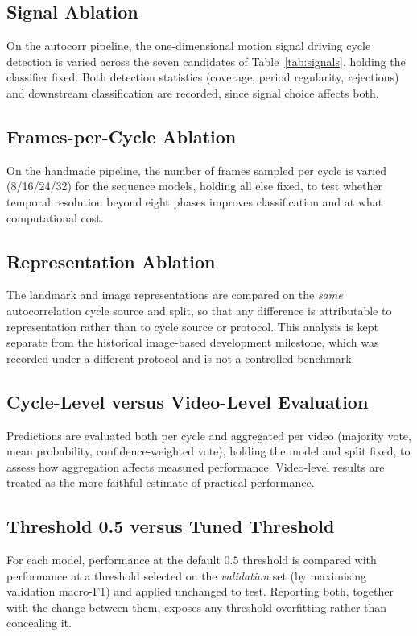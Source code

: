 \subsection{Signal Ablation}
\label{sec:abl-signal}
On the autocorr pipeline, the one-dimensional motion signal driving cycle
detection is varied across the seven candidates of
Table~\ref{tab:signals}, holding the classifier fixed. Both detection
statistics (coverage, period regularity, rejections) and downstream
classification are recorded, since signal choice affects both.

\subsection{Frames-per-Cycle Ablation}
\label{sec:abl-frames}
On the handmade pipeline, the number of frames sampled per cycle is varied
(8/16/24/32) for the sequence models, holding all else fixed, to test whether
temporal resolution beyond eight phases improves classification and at what
computational cost.

\subsection{Representation Ablation}
\label{sec:abl-representation}
The landmark and image representations are compared on the \emph{same}
autocorrelation cycle source and split, so that any difference is attributable
to representation rather than to cycle source or protocol. This analysis is kept
separate from the historical image-based development milestone, which was
recorded under a different protocol and is not a controlled benchmark.

\subsection{Cycle-Level versus Video-Level Evaluation}
\label{sec:abl-cycle-video}
Predictions are evaluated both per cycle and aggregated per video (majority
vote, mean probability, confidence-weighted vote), holding the model and split
fixed, to assess how aggregation affects measured performance. Video-level
results are treated as the more faithful estimate of practical performance.

\subsection{Threshold 0.5 versus Tuned Threshold}
\label{sec:abl-threshold}
For each model, performance at the default $0.5$ threshold is compared with
performance at a threshold selected on the \emph{validation} set (by maximising
validation macro-F1) and applied unchanged to test. Reporting both, together
with the change between them, exposes any threshold overfitting rather than
concealing it.

